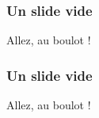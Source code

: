 \begin{frame}
\frametitle{Un slide vide}
Allez, au boulot !
\end{frame}

\begin{frame}
\frametitle{Un slide vide}
Allez, au boulot !
\end{frame}